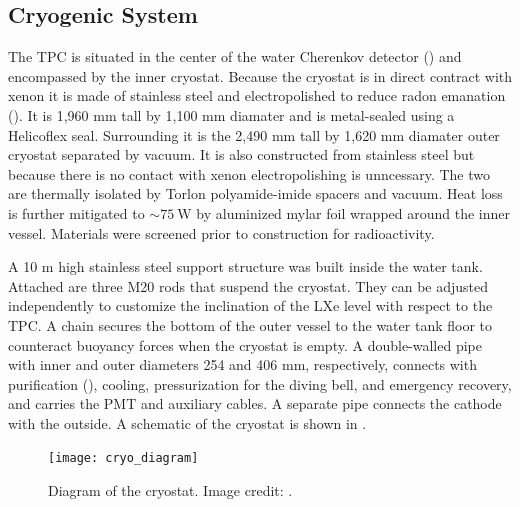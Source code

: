 \subsection{Cryogenic System}
\label{subsec:xenon1t_cryo}
The TPC is situated in the center of the water Cherenkov detector () and encompassed by the inner
cryostat.  Because the cryostat is in direct contract with xenon it is made of stainless steel and electropolished to reduce radon
emanation ().  It is 1,960 mm tall by 1,100 mm diamater and is metal-sealed
using a Helicoflex seal.  Surrounding it is the 2,490 mm tall by 1,620 mm diamater outer cryostat separated by vacuum.  It is also
constructed from stainless steel but
because there is no contact with xenon electropolishing is unncessary.  The two are thermally isolated by Torlon polyamide-imide spacers
and vacuum.  Heat loss is further mitigated to ${\sim} 75\ \mathrm{W}$ by aluminized mylar foil wrapped around the inner
vessel.  Materials were screened prior to construction for
radioactivity.

A 10 m high stainless steel support structure was built inside the water tank.  Attached are three M20 rods that suspend the
cryostat.  They can be adjusted independently to customize the inclination of the LXe level with respect to the
TPC.  A chain secures the bottom of the outer vessel to the water tank floor to counteract buoyancy forces when the cryostat is empty.  A
double-walled pipe with inner and outer diameters 254 and 406 mm, respectively, connects with purification (),
cooling,
pressurization for the diving bell, and emergency recovery, and carries the PMT and auxiliary cables.  A separate pipe connects the
cathode with the outside.  A schematic of the cryostat is shown in .

\begin{figure}
\centering
\texttt{[image: cryo\_diagram]}
\caption{Diagram of the cryostat.  Image credit: .}
\label{fig:xenon1t_cryo_cryostat_diagram}
\end{figure}

